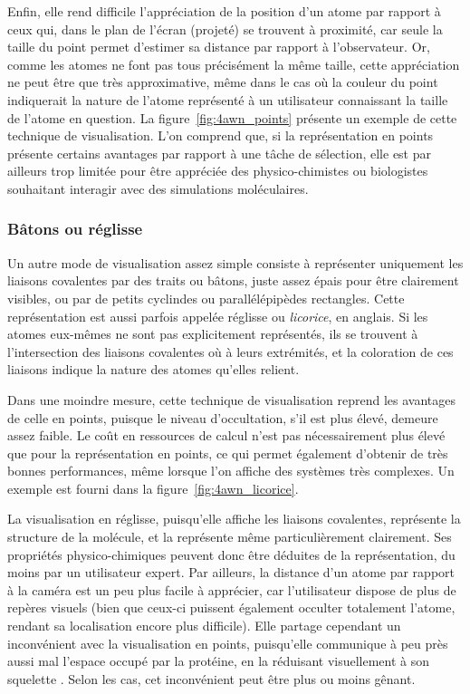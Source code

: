 \begin{appendices}
	Enfin, elle rend difficile l'appréciation de la position d'un atome par rapport à ceux qui, dans le plan de l'écran (projeté) se trouvent à proximité, car seule la taille du point permet d'estimer sa distance par rapport à l'observateur. Or, comme les atomes ne font pas tous précisément la même taille, cette appréciation ne peut être que très approximative, même dans le cas où la couleur du point indiquerait la nature de l'atome représenté à un utilisateur connaissant la taille de l'atome en question. La figure~\ref{fig:4awn_points} présente un exemple de cette technique de visualisation. L'on comprend que, si la représentation en points présente certains avantages par rapport à une tâche de sélection, elle est par ailleurs trop limitée pour être appréciée des physico-chimistes ou biologistes souhaitant interagir avec des simulations moléculaires.
	    
	\subsubsection{Bâtons ou réglisse} Un autre mode de visualisation assez simple consiste à représenter uniquement les liaisons covalentes par des traits ou bâtons, juste assez épais pour être clairement visibles, ou par de petits cyclindes ou parallélépipèdes rectangles. Cette représentation est aussi parfois appelée \og réglisse \fg{} ou \emph{licorice}, en anglais. Si les atomes eux-mêmes ne sont pas explicitement représentés, ils se trouvent à l'intersection des liaisons covalentes où à leurs extrémités, et la coloration de ces liaisons indique la nature des atomes qu'elles relient.
		
	Dans une moindre mesure, cette technique de visualisation reprend les avantages de celle en points, puisque le niveau d'occultation, s'il est plus élevé, demeure assez faible. Le coût en ressources de calcul n'est pas nécessairement plus élevé que pour la représentation en points, ce qui permet également d'obtenir de très bonnes performances, même lorsque l'on affiche des systèmes très complexes. Un exemple est fourni dans la figure~\ref{fig:4awn_licorice}.
		
	La visualisation en réglisse, puisqu'elle affiche les liaisons covalentes, représente la structure de la molécule, et la représente même particulièrement clairement. Ses propriétés physico-chimiques peuvent donc être déduites de la représentation, du moins par un utilisateur expert. Par ailleurs, la distance d'un atome par rapport à la caméra est un peu plus facile à apprécier, car l'utilisateur dispose de plus de repères visuels (bien que ceux-ci puissent également occulter totalement l'atome, rendant sa localisation encore plus difficile). Elle partage cependant un inconvénient avec la visualisation en points, puisqu'elle communique à peu près aussi mal l'espace occupé par la protéine, en la réduisant visuellement à son \og squelette \fg{}. Selon les cas, cet inconvénient peut être plus ou moins gênant.
		

\end{appendices}
